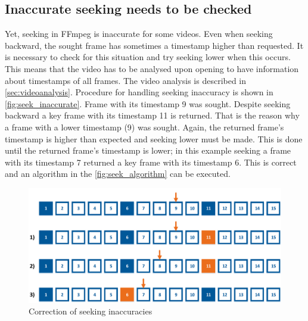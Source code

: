 \subsection{Inaccurate seeking needs to be checked}
Yet, seeking in FFmpeg is inaccurate for some videos. Even when seeking backward, the sought frame has sometimes a timestamp higher than requested. It is necessary to check for this situation and try seeking lower when this occurs. This means that the video has to be analysed upon opening to have information about timestamps of all frames. The video analysis is described in \autoref{sec:videoanalysis}. Procedure for handling seeking inaccuracy is shown in \autoref{fig:seek_inaccurate}. Frame with its timestamp 9 was sought. Despite seeking backward a key frame with its timestamp 11 is returned. That is the reason why a frame with a lower timestamp (9) was sought. Again, the returned frame's timestamp is higher than expected and seeking lower must be made. This is done until the returned frame's timestamp is lower; in this example seeking a frame with its timestamp 7 returned a key frame with its timestamp 6. This is correct and an algorithm in the \autoref{fig:seek_algorithm} can be executed.
\begin{figure}[!htbp]
\centering
\includegraphics[width=\textwidth]{fig/seeking_inaccurate}
\caption{Correction of seeking inaccuracies}
\label{fig:seek_inaccurate}
\end{figure}

